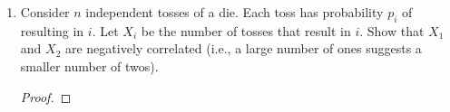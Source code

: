 \documentclass[paper=usletter, fontsize=12pt]{article}
\begin{document}
\begin{enumerate}
\begin{proof}
            Given,
            \begin{equation*}
                E[x_i] = \mu, \  var(x_i) = \sigma^2, \text{for } 1 \le i \le n
            \end{equation*}
            Also, given for every pair $i$ and $j$, $E[X_iX_j]=c$\\
            Then,
            \begin{align*}
                cov(X_iX_j) &= E[X_iX_j] - E[X_i]E[X_j]\\
                & = c - \mu \cdot \mu\\
                & = c - \mu^2
            \end{align*}
            \begin{align*}
                var(X_1+\ldots+X_n) &= var(X_1) + var(X_2) + \ldots + var(X_n) + 2cov(X_1,X_2) + 2cov(X_2,X_3)+\ldots+ 2cov(X_{n-1},X_{n}) \\
                & = \sum_{i=1}^{n}var(X_i)+\sum_{i=1}^{n-1}\sum_{j=2}^{n}2cov(X_i,X_j)\\
                & = \sum_{i=1}^{n}\sigma^2 + \sum_{i=1}^{n-1}\sum_{j=2}^{n}2(c-\mu^2) \\
                & = n\sigma^2 + (n-1)2(c-\mu^2) \\
                & = n\sigma^2 + 2(n-1)(c-\mu^2)  \qedhere
            \end{align*}
            \endgroup

        \end{proof}

        \item Consider $n$ independent tosses of a die. Each toss has
        probability $p_i$ of resulting in $i$. Let $X_i$ be the number of
        tosses that result in $i$. Show that $X_1$ and $X_2$ are negatively
        correlated (i.e., a large number of ones suggests a smaller number of
        twos).
        \begin{proof}


\end{proof}
\end{enumerate}
\end{document}
